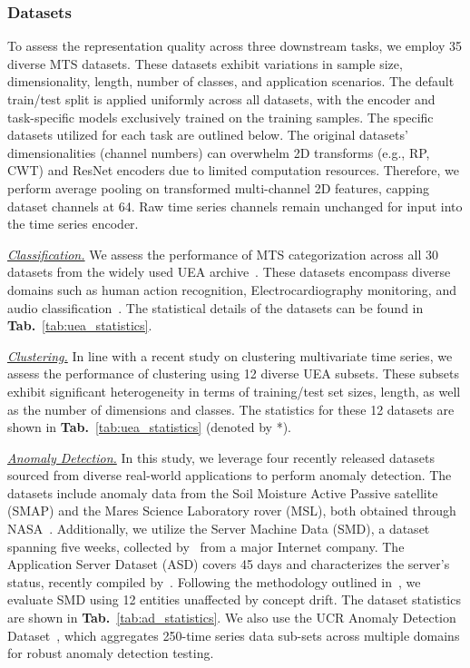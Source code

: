 \documentclass{article}
\begin{document}
\subsubsection{Datasets} To assess the representation quality across three downstream tasks, we employ 35 diverse MTS datasets. These datasets exhibit variations in sample size, dimensionality, length, number of classes, and application scenarios. The default train/test split is applied uniformly across all datasets, with the encoder and task-specific models exclusively trained on the training samples. The specific datasets utilized for each task are outlined below. The original datasets' dimensionalities (channel numbers) can overwhelm 2D transforms (e.g., RP, CWT) and ResNet encoders due to limited computation resources. Therefore, we perform average pooling on transformed multi-channel 2D features, capping dataset channels at 64. Raw time series channels remain unchanged for input into the time series encoder.




\textit{\underline{Classification.}} We assess the performance of MTS categorization across all 30 datasets from the widely used UEA archive~\cite{bagnall2018uea}. These datasets encompass diverse domains such as human action recognition, Electrocardiography monitoring, and audio classification~\cite{bagnall2018uea}. The statistical details of the datasets can be found in \textbf{Tab.}~\ref{tab:uea_statistics}.

\textit{\underline{Clustering.}} In line with a recent study on clustering multivariate time series, we assess the performance of clustering using 12 diverse UEA subsets. These subsets exhibit significant heterogeneity in terms of training/test set sizes, length, as well as the number of dimensions and classes. The statistics for these 12 datasets are shown in \textbf{Tab.}~\ref{tab:uea_statistics} (denoted by *).


\textit{\underline{Anomaly Detection.}} In this study, we leverage four recently released datasets sourced from diverse real-world applications to perform anomaly detection. The datasets include anomaly data from the Soil Moisture Active Passive satellite (SMAP) and the Mares Science Laboratory rover (MSL), both obtained through NASA~\cite{hundman2018detecting}. Additionally, we utilize the Server Machine Data (SMD), a dataset spanning five weeks, collected by~\cite{su2019robust} from a major Internet company. The Application Server Dataset (ASD) covers 45 days and characterizes the server's status, recently compiled by~\cite{li2021multivariate}. Following the methodology outlined in~\cite{li2021multivariate}, we evaluate SMD using 12 entities unaffected by concept drift. The dataset statistics are shown in \textbf{Tab.}~\ref{tab:ad_statistics}. We also use the UCR Anomaly Detection Dataset~\cite{Wu2020CurrentTS}, which aggregates 250-time series data sub-sets across multiple domains for robust anomaly detection testing.
\end{document}
